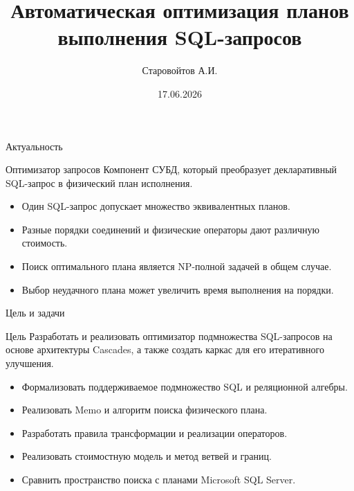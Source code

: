 \documentclass{beamer}
\title[Автоматическая оптимизация планов выполнения SQL-запросов]{Автоматическая оптимизация планов выполнения SQL-запросов}
\date[17.06.2026]{17.06.2026}
\author[Старовойтов А.И.]{Старовойтов А.И.}
\institute{\contourlength{0.05em}\iutitle{МГТУ им. Н.Э. Баумана}\\\vspace*{-2ex}\\ \iutitle{Кафедра <<Теоретическая информатика}\\
\iutitleupd{\qquad\qquad\qquad\qquad и компьютерные технологии>>}}
\begin{document}
\begin{frame}[plain]
\titlepage
\end{frame}

\begin{frame}{Актуальность}
\begin{block}{Оптимизатор запросов}
Компонент СУБД, который преобразует декларативный SQL-запрос в физический план
исполнения.
\end{block}

\begin{itemize}
  \item Один SQL-запрос допускает множество эквивалентных планов.
  \item Разные порядки соединений и физические операторы дают различную стоимость.
  \item Поиск оптимального плана является NP-полной задачей в общем случае.
  \item Выбор неудачного плана может увеличить время выполнения на порядки.
\end{itemize}
\end{frame}

\begin{frame}{Цель и задачи}
\begin{block}{Цель}
Разработать и реализовать оптимизатор подмножества SQL-запросов на основе
архитектуры Cascades, а также создать каркас для его итеративного улучшения.
\end{block}

\begin{itemize}
  \item Формализовать поддерживаемое подмножество SQL и реляционной алгебры.
  \item Реализовать Memo и алгоритм поиска физического плана.
  \item Разработать правила трансформации и реализации операторов.
  \item Реализовать стоимостную модель и метод ветвей и границ.
  \item Сравнить пространство поиска с планами Microsoft SQL Server.
\end{itemize}
\end{frame}
\end{document}
